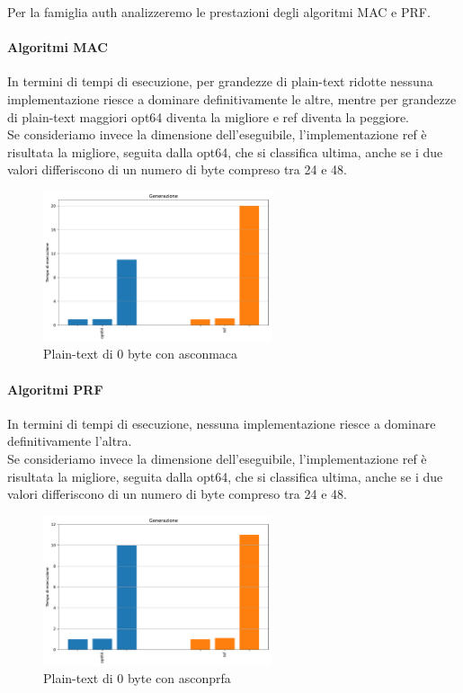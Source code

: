 \documentclass[12pt,a4paper,italian]{report}
\begin{document}
Per la famiglia auth analizzeremo le prestazioni degli algoritmi MAC e PRF.

\paragraph{Algoritmi MAC}

In termini di tempi di esecuzione, per grandezze di plain-text ridotte nessuna implementazione riesce a dominare definitivamente le altre, mentre per grandezze di plain-text maggiori opt64 diventa la migliore e ref diventa la peggiore. \\

\noindent Se consideriamo invece la dimensione dell'eseguibile, l'implementazione ref  è risultata la migliore, seguita dalla opt64, che si classifica ultima, anche se i due valori differiscono di un numero di byte compreso tra 24 e 48.

\begin{figure}[H]
    \centering
    \includegraphics[width=0.6\textwidth]{raspberry/asconmaca.pdf}
    \caption{Plain-text di 0 byte con asconmaca}
\end{figure}

\paragraph{Algoritmi PRF}

In termini di tempi di esecuzione, nessuna implementazione riesce a dominare definitivamente l'altra. \\

\noindent Se consideriamo invece la dimensione dell'eseguibile, l'implementazione ref  è risultata la migliore, seguita dalla opt64, che si classifica ultima, anche se i due valori differiscono di un numero di byte compreso tra 24 e 48.

\begin{figure}[H]
    \centering
    \includegraphics[width=0.6\textwidth]{raspberry/asconprfa.pdf}
    \caption{Plain-text di 0 byte con asconprfa}
\end{figure}
\end{document}
